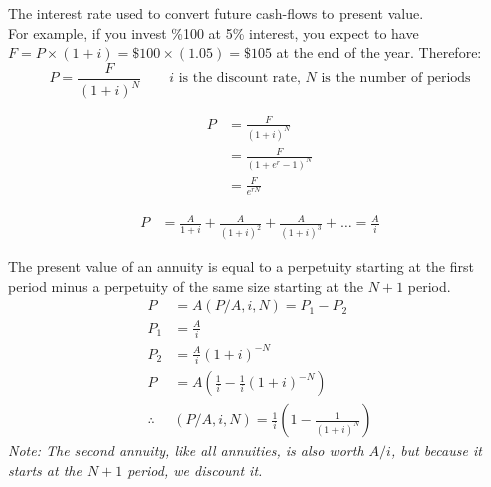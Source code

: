 \begin{definition}
    The interest rate used to convert future cash-flows to present value.\\
    For example, if you invest \%100 at 5\% interest, you expect to have $F = P \times (1+i) = \$100\times(1.05) = \$105$ at the end of the year. Therefore:
    \[
        P = \frac{F}{(1+i)^N} \qquad i \text{ is the discount rate, $N$ is the number of periods}
    \]
\end{definition}

\begin{corollary}
    \begin{align}
        P & = \frac{F}{(1+i)^N}         \\
          & = \frac{F}{(1 + e^r - 1)^N} \\
          & = \frac{F}{e^{rN}}
    \end{align}
\end{corollary}

\begin{definition}
    \begin{align}
        P & = \frac{A}{1 + i} + \frac{A}{(1+i)^2} + \frac{A}{(1+i)^3} + \ldots = \frac{A}{i}
    \end{align}
\end{definition}

\begin{definition}
    The present value of an annuity is equal to a perpetuity starting at the first period minus a perpetuity of the same size starting at the $N+1$ period.
    \begin{align}
        P          & = A(P/A, i, N) = P_1 - P_2                                  \\
        P_1        & = \frac{A}{i}                                               \\
        P_2        & = \frac{A}{i}(1+i)^{-N}                                     \\
        P          & = A(\frac{1}{i} - \frac{1}{i}(1+i)^{-N})                    \\
        \therefore & \boxed{(P/A, i, N) = \frac{1}{i}( 1 - \frac{1}{(1+i)^{N}})}
    \end{align}
    \textit{Note: The second annuity, like all annuities, is also worth $A/i$, but because it starts at the $N+1$ period, we discount it.}
\end{definition}


